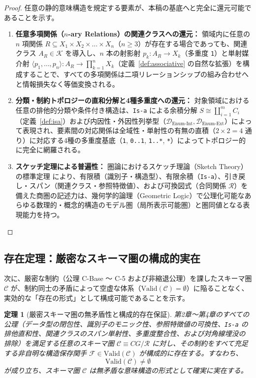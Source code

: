 \documentclass[11pt,a4paper]{ltjsarticle}
\theoremstyle{definition}
\theoremstyle{plain}
\newtheorem{theorem}{定理}[section]
\theoremstyle{remark}
\newcommand{\Valid}{\mathrm{Valid}}
\newcommand{\Denumint}{\mathcal{D}_{\mathrm{Enum\text{-}Int}}}
\newcommand{\Denumext}{\mathcal{D}_{\mathrm{Enum\text{-}Ext}}}
\begin{document}
\begin{proof}
任意の静的意味構造を規定する要素が、本稿の基底へと完全に還元可能であることを示す。
\begin{enumerate}
    \item \textbf{任意多項関係（$n$-ary Relations）の関連クラスへの還元：} 領域内に任意の $n$ 項関係 $R \subseteq X_1 \times X_2 \times \dots \times X_n$（$n \ge 3$）が存在する場合であっても、関連クラス $A_R \in \mathcal{K}$ を導入し、$n$ 本の射影射 $p_k : A_R \to X_k$（多重度 \texttt{1}）と単射媒介射 $\langle p_1, \dots, p_n \rangle : A_R \to \prod_{k=1}^n X_k$（定義~\ref{def:associative} の自然な拡張）を構成することで、すべての多項関係は二項リレーションシップの組み合わせへと情報損失なく等価変換される。
    \item \textbf{分類・制約トポロジーの直和分解と4種多重度への還元：} 対象領域における任意の排他的分類や条件付き構造は、\texttt{Is-a} による余積分解 $S \cong \coprod_{i=1}^m C_i$（定義~\ref{def:isa}）および内因性・外因性列挙型（$\Denumint, \Denumext$）によって表現され、要素間の対応関係は全域性・単射性の有無の直積（$2 \times 2 = 4$ 通り）に対応する4種の多重度基底（\texttt{1}, \texttt{0..1}, \texttt{1..*}, \texttt{*}）によってトポロジー的に完全に網羅される。
    \item \textbf{スケッチ定理による普遍性：} 圏論におけるスケッチ理論（Sketch Theory）の標準定理 \cite{gabriel1971,barr1990} により、有限積（識別子・構造型）、有限余積（\texttt{Is-a}）、引き戻し・スパン（関連クラス・参照特徴値）、および可換図式（合同関係 $\mathcal{R}$）を備えた商圏の記述力は、幾何学的論理（Geometric Logic）で公理化可能なあらゆる数理的・概念的構造のモデル圏（局所表示可能圏）と圏同値となる表現能力を持つ。 \qedhere
\end{enumerate}
\end{proof}

\subsection{存在定理：厳密なスキーマ圏の構成的実在}
次に、厳密な制約（公理 C-Base 〜 C-5 および非縮退公理）を課したスキーマ圏 $\mathcal{C}$ が、制約同士の矛盾によって空虚な体系（$\Valid(\mathcal{C}) = \emptyset$）に陥ることなく、実効的な「存在の形式」として構成可能であることを示す。

\begin{theorem}[厳密スキーマ圏の無矛盾性と構成的存在保証]\label{thm:existence}
第2章〜第4章のすべての公理（データ型の閉包性、識別子のモニック性、参照特徴値の可換性、\texttt{Is-a} の排他直和性、関連クラスのスパン単射性、多重度整合性、および対角線埋没の排除）を満足する任意のスキーマ圏 $\mathcal{C} \equiv CG/\mathcal{R}$ に対し、その制約をすべて充足する非自明な構造保存関手 $\mathcal{F} \in \Valid(\mathcal{C})$ が構成的に存在する。すなわち、
\begin{equation}
\Valid(\mathcal{C}) \neq \emptyset
\end{equation}
が成り立ち、スキーマ圏 $\mathcal{C}$ は無矛盾な意味構造の形式として確実に実在する。
\end{theorem}
\end{document}
